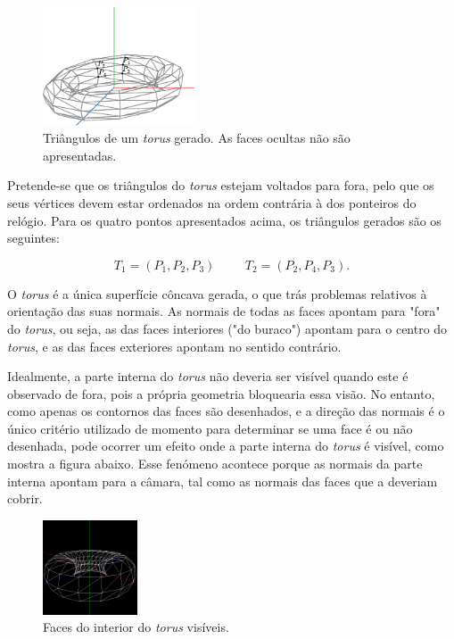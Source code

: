\documentclass[12pt, a4paper]{article}
\begin{document}
\begin{figure}[H]
    \centering
    \includegraphics[width=0.4\textwidth]{res/phase1/figures/TorusTriangle.pdf}
    \caption{Triângulos de um \emph{torus} gerado. As faces ocultas não são apresentadas.}
\end{figure}

Pretende-se que os triângulos do \emph{torus} estejam voltados para fora, pelo que os seus vértices
devem estar ordenados na ordem contrária à dos ponteiros do relógio. Para os quatro pontos
apresentados acima, os triângulos gerados são os seguintes:

$$
T_1 = (P_1, P_2, P_3)
\hspace{1cm}
T_2 = (P_2, P_4, P_3).
$$

O \emph{torus} é a única superfície côncava gerada, o que trás problemas relativos à orientação das
suas normais. As normais de todas as faces apontam para "fora"{} do \emph{torus}, ou seja, as das
faces interiores ("do buraco"{}) apontam para o centro do \emph{torus}, e as das faces exteriores
apontam no sentido contrário.

Idealmente, a parte interna do \emph{torus} não deveria ser visível quando este é observado de fora,
pois a própria geometria bloquearia essa visão. No entanto, como apenas os contornos das faces são
desenhados, e a direção das normais é o único critério utilizado de momento para determinar se uma
face é ou não desenhada, pode ocorrer um efeito onde a parte interna do \emph{torus} é visível, como
mostra a figura abaixo. Esse fenómeno acontece porque as normais da parte interna apontam para a
câmara, tal como as normais das faces que a deveriam cobrir.

\begin{figure}[H]
    \centering
    \includegraphics[width=0.25\textwidth]{res/phase1/figures/TorusVisibleFaces.png}
    \caption{Faces do interior do \emph{torus} visíveis.}
\end{figure}
\end{document}
